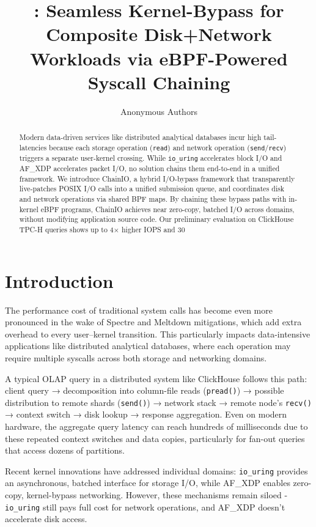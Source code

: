\documentclass[sigconf,10pt]{acmart}
\title{\sys: Seamless Kernel-Bypass for Composite Disk+Network Workloads via eBPF-Powered Syscall Chaining}
\author{
Anonymous Authors
}
\newcommand{\sys}{ChainIO\xspace}
\begin{document}
\begin{abstract}
Modern data-driven services like distributed analytical databases incur high tail-latencies because each storage operation (\texttt{read}) and network operation (\texttt{send}/\texttt{recv}) triggers a separate user-kernel crossing. While \texttt{io\_uring} accelerates block I/O and AF\_XDP accelerates packet I/O, no solution chains them end-to-end in a unified framework. We introduce \sys, a hybrid I/O-bypass framework that transparently live-patches POSIX I/O calls into a unified submission queue, and coordinates disk and network operations via shared BPF maps. By chaining these bypass paths with in-kernel eBPF programs, \sys achieves near zero-copy, batched I/O across domains, without modifying application source code. Our preliminary evaluation on ClickHouse TPC-H queries shows up to 4× higher IOPS and 30%
\end{abstract}

\maketitle

\section{Introduction}

The performance cost of traditional system calls has become even more pronounced in the wake of Spectre and Meltdown mitigations, which add extra overhead to every user–kernel transition. This particularly impacts data-intensive applications like distributed analytical databases, where each operation may require multiple syscalls across both storage and networking domains.

A typical OLAP query in a distributed system like ClickHouse follows this path: client query → decomposition into column-file reads (\texttt{pread()}) → possible distribution to remote shards (\texttt{send()}) → network stack → remote node's \texttt{recv()} → context switch → disk lookup → response aggregation. Even on modern hardware, the aggregate query latency can reach hundreds of milliseconds due to these repeated context switches and data copies, particularly for fan-out queries that access dozens of partitions.

Recent kernel innovations have addressed individual domains: \texttt{io\_uring} provides an asynchronous, batched interface for storage I/O, while AF\_XDP enables zero-copy, kernel-bypass networking. However, these mechanisms remain siloed - \texttt{io\_uring} still pays full cost for network operations, and AF\_XDP doesn't accelerate disk access.
\end{document}
